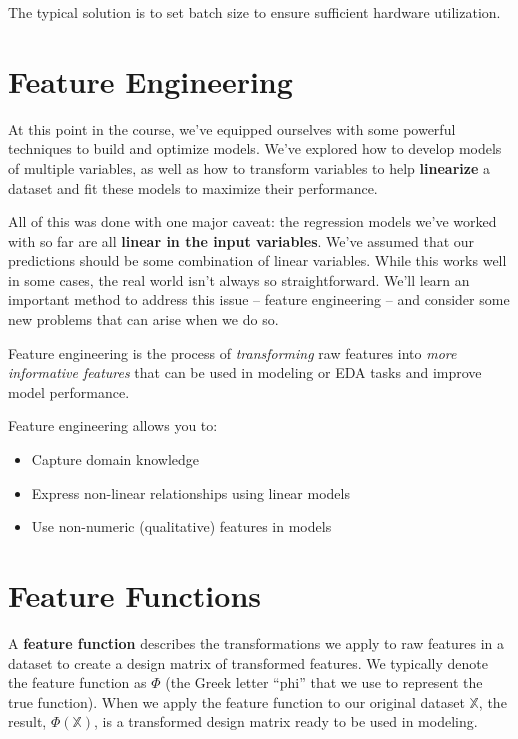 \documentclass[
  letterpaper,
  DIV=11,
  numbers=noendperiod]{scrreprt}
\providecommand{\tightlist}{%
  \setlength{\itemsep}{0pt}\setlength{\parskip}{0pt}}\usepackage{longtable,booktabs,array}
\begin{document}
The typical solution is to set batch size to ensure sufficient hardware
utilization.

\section{Feature Engineering}\label{feature-engineering-1}

At this point in the course, we've equipped ourselves with some powerful
techniques to build and optimize models. We've explored how to develop
models of multiple variables, as well as how to transform variables to
help \textbf{linearize} a dataset and fit these models to maximize their
performance.

All of this was done with one major caveat: the regression models we've
worked with so far are all \textbf{linear in the input variables}. We've
assumed that our predictions should be some combination of linear
variables. While this works well in some cases, the real world isn't
always so straightforward. We'll learn an important method to address
this issue -- feature engineering -- and consider some new problems that
can arise when we do so.

Feature engineering is the process of \emph{transforming} raw features
into \emph{more informative features} that can be used in modeling or
EDA tasks and improve model performance.

Feature engineering allows you to:

\begin{itemize}
\tightlist
\item
  Capture domain knowledge
\item
  Express non-linear relationships using linear models
\item
  Use non-numeric (qualitative) features in models
\end{itemize}

\section{Feature Functions}\label{feature-functions}

A \textbf{feature function} describes the transformations we apply to
raw features in a dataset to create a design matrix of transformed
features. We typically denote the feature function as \(\Phi\) (the
Greek letter ``phi'' that we use to represent the true function). When
we apply the feature function to our original dataset \(\mathbb{X}\),
the result, \(\Phi(\mathbb{X})\), is a transformed design matrix ready
to be used in modeling.
\end{document}
